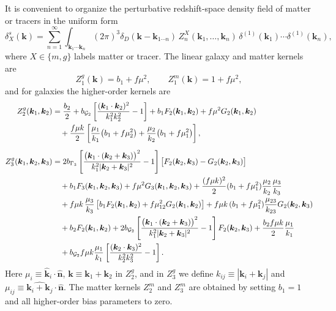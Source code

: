 \documentclass[a4paper,11pt]{article}
\newcommand{\nhat}{\hat{n}}
\newcommand{\vnhat}{\bm{\nhat}}
\newcommand{\vk}{\bm{k}}
\newcommand{\<}{\langle}
\renewcommand{\>}{\rangle}
\begin{document}
It is convenient to organize the perturbative redshift-space density field of matter or tracers in the uniform form
\begin{equation}
\delta_X^s(\vk)
=
\sum_{n=1}^{\infty}
\int_{\vk_1\cdots \vk_n}
(2\pi)^3\delta_D(\vk-\vk_{1\cdots n})
\,Z_n^X(\vk_1,\ldots,\vk_n)\,
\delta^{(1)}(\vk_1)\cdots \delta^{(1)}(\vk_n),
\label{eq:deltaXs_Zn_expansion}
\end{equation}
where \(X\in\{m,g\}\) labels matter or tracer. The linear galaxy and matter kernels are
\begin{equation}
Z_1^g(\vk)=b_1+f\mu^2,
\qquad
Z_1^m(\vk)=1+f\mu^2,
\label{eq:Z1gm}
\end{equation}
and for galaxies the higher-order kernels are
\begin{align}
Z_2^g(\vk_1,\vk_2)
&=
\frac{b_2}{2}
+b_{\mathcal G_2}\left[\frac{(\vk_1\cdot \vk_2)^2}{k_1^2k_2^2}-1\right]
+b_1 F_2(\vk_1,\vk_2)
+f\mu^2 G_2(\vk_1,\vk_2)
\notag\\
&\quad
+\frac{f\mu k}{2}
\left[
\frac{\mu_1}{k_1}\bigl(b_1+f\mu_2^2\bigr)
+
\frac{\mu_2}{k_2}\bigl(b_1+f\mu_1^2\bigr)
\right],
\label{eq:Z2g}
\\[0.5em]
Z_3^g(\vk_1,\vk_2,\vk_3)
&=
2b_{\Gamma_3}
\left[
\frac{\bigl(\vk_1\cdot (\vk_2+\vk_3)\bigr)^2}
{k_1^2|\vk_2+\vk_3|^2}
-1
\right]
\bigl[F_2(\vk_2,\vk_3)-G_2(\vk_2,\vk_3)\bigr]
\notag\\
&\quad
+b_1 F_3(\vk_1,\vk_2,\vk_3)
+f\mu^2 G_3(\vk_1,\vk_2,\vk_3)
+\frac{(f\mu k)^2}{2}(b_1+f\mu_1^2)\frac{\mu_2}{k_2}\frac{\mu_3}{k_3}
\notag\\
&\quad
+f\mu k\,\frac{\mu_3}{k_3}
\left[
 b_1 F_2(\vk_1,\vk_2)
 +f\mu_{12}^2 G_2(\vk_1,\vk_2)
\right]
+f\mu k\,(b_1+f\mu_1^2)\frac{\mu_{23}}{k_{23}}G_2(\vk_2,\vk_3)
\notag\\
&\quad
+b_2 F_2(\vk_1,\vk_2)
+2b_{\mathcal G_2}
\left[
\frac{\bigl(\vk_1\cdot (\vk_2+\vk_3)\bigr)^2}
{k_1^2|\vk_2+\vk_3|^2}
-1
\right]
F_2(\vk_2,\vk_3)
+\frac{b_2 f\mu k}{2}\frac{\mu_1}{k_1}
\notag\\
&\quad
+b_{\mathcal G_2}f\mu k\frac{\mu_1}{k_1}
\left[
\frac{(\vk_2\cdot \vk_3)^2}{k_2^2k_3^2}-1
\right].
\label{eq:Z3g}
\end{align}
Here \(\mu_i\equiv \hat{\vk}_i\cdot\vnhat\), \(\vk\equiv \vk_1+\vk_2\) in \(Z_2^g\), and in \(Z_3^g\) we define \(k_{ij}\equiv |\vk_i+\vk_j|\) and \(\mu_{ij}\equiv \widehat{\vk_i+\vk_j}\cdot\vnhat\). The matter kernels \(Z_2^m\) and \(Z_3^m\) are obtained by setting \(b_1=1\) and all higher-order bias parameters to zero.
\end{document}
